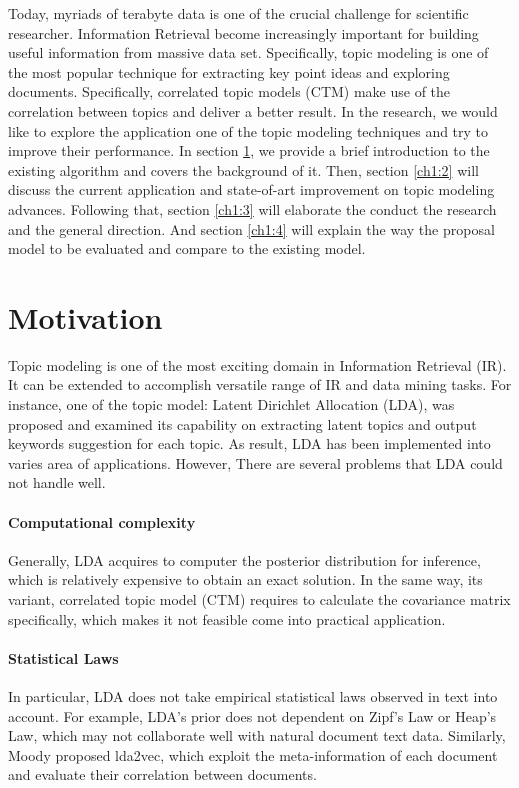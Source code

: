 Today, myriads of terabyte data is one of the crucial challenge for scientific researcher.  Information Retrieval become increasingly important for building useful information from massive data set. Specifically, topic modeling is one of the most popular technique for extracting key point ideas and exploring documents. Specifically, correlated topic models (CTM) make use of the correlation between topics and deliver a better result. In the research, we would like to explore the application one of the topic modeling techniques and try to improve their performance. In section \ref{ch1:1}, we provide a brief introduction to the existing algorithm and covers the background of it. Then, section \ref{ch1:2} will discuss the current application and state-of-art improvement on topic modeling advances. Following that, section \ref{ch1:3} will elaborate the conduct the research and the general direction. And section \ref{ch1:4} will explain the way the proposal model to be evaluated and compare to the existing model.
\section{Motivation}\label{ch1:1}
Topic modeling is one of the most exciting domain in Information Retrieval (IR). It can be extended to accomplish versatile range of IR and data mining tasks. For instance, one of the topic model: Latent Dirichlet Allocation (LDA), was proposed and examined its capability on extracting latent topics and output keywords suggestion for each topic. As result, LDA has been implemented into varies area of applications. However, There are several problems that LDA could not handle well.
\paragraph{Computational complexity}
Generally, LDA acquires to computer the posterior distribution for inference, which is relatively expensive to obtain an exact solution. In the same way, its variant, correlated topic model (CTM) requires to calculate the covariance matrix specifically, which makes it not feasible come into practical application.
\paragraph{Statistical Laws}In particular, LDA does not take empirical statistical laws observed in text into account. For example, LDA's prior does not dependent on Zipf's Law or Heap's Law, which may not collaborate well with natural document text data. Similarly, Moody\cite{moody_mixing_2016} proposed lda2vec, which exploit the meta-information of each document and evaluate their correlation between documents.

